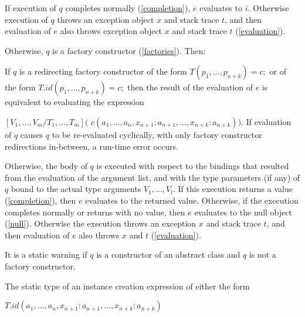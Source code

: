 \documentclass{article}
\newcommand{\code}[1]{{\sf #1}}
\begin{document}
If execution of $q$ completes normally (\ref{completion}), $e$ evaluates to $i$.
Otherwise execution of $q$ throws an exception object $x$ and stack trace $t$,
and then evaluation of $e$ also throws exception object $x$ and stack trace $t$
(\ref{evaluation}).

\LMHash{}
Otherwise, $q$ is a factory constructor (\ref{factories}). Then:

\LMHash{}
If $q$ is a redirecting factory constructor of the form $T(p_1, \ldots, p_{n+k}) = c;$ or of the form  $T.id(p_1, \ldots, p_{n+k}) = c;$ then the result of the evaluation of $e$ is equivalent to evaluating the expression

$[V_1,  \ldots, V_m/T_1,  \ldots, T_m]($\code{\NEW{} $c(a_1, \ldots, a_n, x_{n+1}: a_{n+1}, \ldots, x_{n+k}: a_{n+k}))$}.  If evaluation of $q$ causes $q$ to be re-evaluated cyclically, with only factory constructor redirections in-between, a run-time error occurs.


\LMHash{}
Otherwise, the body of $q$ is executed with respect to the bindings that resulted from the evaluation of the argument list, and with the type parameters (if any) of $q$ bound to the actual type arguments $V_1, \ldots, V_l$.
If this execution returns a value (\ref{completion}),
then $e$ evaluates to the returned value.
Otherwise, if the execution completes normally or returns with no value,
then $e$ evaluates to the null object (\ref{null}).
Otherwise the execution throws an exception $x$ and stack trace $t$,
and then evaluation of $e$ also throws $x$ and $t$ (\ref{evaluation}).

\LMHash{}
It is a static warning if $q$ is a constructor of an abstract class and $q$ is not a factory constructor.



\LMHash{}
The static type of an instance creation expression of either the form

\NEW{} $T.id(a_1, \ldots , a_n, x_{n+1}: a_{n+1}, \ldots , x_{n+k}: a_{n+k})$
\end{document}
